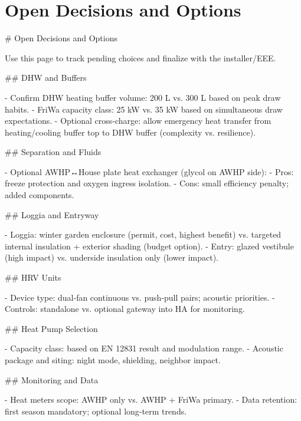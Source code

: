 \documentclass[11pt,oneside]{report}
\begin{document}
\chapter{Open Decisions and Options}
\begin{markdown}
# Open Decisions and Options

Use this page to track pending choices and finalize with the installer/EEE.

## DHW and Buffers

- Confirm DHW heating buffer volume: 200 L vs. 300 L based on peak draw habits.
- FriWa capacity class: 25 kW vs. 35 kW based on simultaneous draw expectations.
- Optional cross‑charge: allow emergency heat transfer from heating/cooling buffer top to DHW buffer (complexity vs. resilience).

## Separation and Fluids

- Optional AWHP↔House plate heat exchanger (glycol on AWHP side):
  - Pros: freeze protection and oxygen ingress isolation.
  - Cons: small efficiency penalty; added components.

## Loggia and Entryway

- Loggia: winter garden enclosure (permit, cost, highest benefit) vs. targeted internal insulation + exterior shading (budget option).
- Entry: glazed vestibule (high impact) vs. underside insulation only (lower impact).

## HRV Units

- Device type: dual‑fan continuous vs. push‑pull pairs; acoustic priorities.
- Controls: standalone vs. optional gateway into HA for monitoring.

## Heat Pump Selection

- Capacity class: based on EN 12831 result and modulation range.
- Acoustic package and siting: night mode, shielding, neighbor impact.

## Monitoring and Data

- Heat meters scope: AWHP only vs. AWHP + FriWa primary.
- Data retention: first season mandatory; optional long‑term trends.
\end{markdown}
\end{document}
